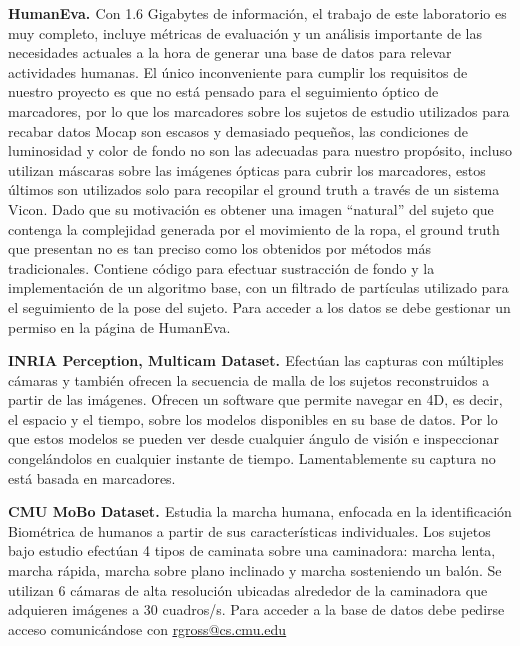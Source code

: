 \textbf{HumanEva. \cite{HumanEvaWeb}}
Con 1.6 Gigabytes de información, el trabajo de este laboratorio es muy completo, incluye métricas de evaluación y un análisis importante de las necesidades actuales a la hora de generar una base de datos para relevar actividades humanas. El único inconveniente para cumplir los requisitos de nuestro proyecto es que no está pensado para el seguimiento óptico de marcadores, por lo que los marcadores sobre los sujetos de estudio utilizados para recabar datos Mocap son escasos y demasiado pequeños, las condiciones de luminosidad y color de fondo no son las adecuadas para nuestro propósito, incluso utilizan máscaras sobre las imágenes ópticas para cubrir los marcadores, estos últimos son utilizados solo para recopilar el ground truth a través de un sistema Vicon.  Dado que su motivación es obtener una imagen ``natural'' del sujeto que contenga la complejidad generada por el movimiento de la ropa, el ground truth que presentan  no es tan preciso como los obtenidos por métodos más tradicionales.  Contiene código para efectuar sustracción de fondo y la implementación de un algoritmo base, con un filtrado de partículas utilizado para el seguimiento de la pose del sujeto. Para acceder a los datos se debe gestionar un permiso en la página de HumanEva. 

\textbf{INRIA Perception, Multicam Dataset. \cite{INRIA}}
Efectúan las capturas con múltiples cámaras y también ofrecen la secuencia de malla de los sujetos reconstruidos a partir de las imágenes. Ofrecen un software que permite navegar en 4D, es decir, el espacio y el tiempo, sobre los modelos disponibles en su base de datos. Por lo que estos modelos se pueden ver desde cualquier ángulo de visión e inspeccionar congelándolos en cualquier instante de tiempo. Lamentablemente su captura no está basada en marcadores. 

\textbf{CMU MoBo Dataset. \cite{Mobo}}
Estudia la marcha humana, enfocada en la identificación Biométrica de humanos a partir de sus características individuales. Los sujetos bajo estudio efectúan 4 tipos de caminata sobre una caminadora: marcha lenta, marcha rápida, marcha sobre plano inclinado y marcha sosteniendo un balón. Se utilizan 6 cámaras de alta resolución ubicadas alrededor de la caminadora que adquieren imágenes a 30 cuadros/s. Para acceder a la base de datos debe pedirse acceso comunicándose con \textcolor{blue}{\underline{\url{rgross@cs.cmu.edu }}}

